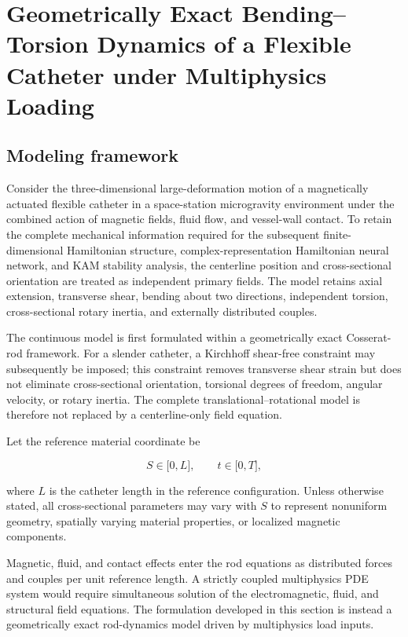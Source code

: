 \section{Geometrically Exact Bending--Torsion Dynamics of a Flexible Catheter under Multiphysics Loading}\label{sec:rod-model}

\subsection{Modeling framework}\label{sec:rod-1-1}

Consider the three-dimensional large-deformation motion of a magnetically actuated flexible catheter in a space-station microgravity environment under the combined action of magnetic fields, fluid flow, and vessel-wall contact. To retain the complete mechanical information required for the subsequent finite-dimensional Hamiltonian structure, complex-representation Hamiltonian neural network, and KAM stability analysis, the centerline position and cross-sectional orientation are treated as independent primary fields. The model retains axial extension, transverse shear, bending about two directions, independent torsion, cross-sectional rotary inertia, and externally distributed couples.

The continuous model is first formulated within a geometrically exact Cosserat-rod framework. For a slender catheter, a Kirchhoff shear-free constraint may subsequently be imposed; this constraint removes transverse shear strain but does not eliminate cross-sectional orientation, torsional degrees of freedom, angular velocity, or rotary inertia. The complete translational--rotational model is therefore not replaced by a centerline-only field equation.\cite{Simo1985FiniteStrainBeam,Antman2005Elasticity,MarsdenRatiu1999MechanicsSymmetry}

Let the reference material coordinate be

\begin{equation}
\label{eq:rod-1-1}
S \in \lbrack 0,L\rbrack,\quad\quad t \in \lbrack 0,T\rbrack,
\end{equation}

where \(L\) is the catheter length in the reference configuration. Unless otherwise stated, all cross-sectional parameters may vary with \(S\) to represent nonuniform geometry, spatially varying material properties, or localized magnetic components.

Magnetic, fluid, and contact effects enter the rod equations as distributed forces and couples per unit reference length. A strictly coupled multiphysics PDE system would require simultaneous solution of the electromagnetic, fluid, and structural field equations. The formulation developed in this section is instead a geometrically exact rod-dynamics model driven by multiphysics load inputs.

